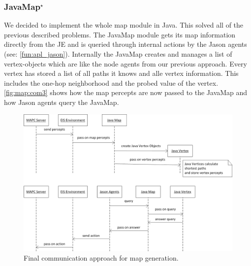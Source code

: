 \subsubsection[JavaMap]{JavaMap$^\star$}\label{alg:map_javamap}
We decided to implement the whole map module in Java. This solved all of the previous described problems. The JavaMap module gets its map information directly from the JE and is queried through internal actions by the Jason agents (see: \autoref{fun:apl_jason}). Internally the JavaMap creates and manages a list of vertex-objects which are like the node agents from our previous approach. Every vertex has stored a list of all paths it knows and alle vertex information. This includes the one-hop neighborhood and the probed value of the vertex. \autoref{fig:map:com3} shows how the map percepts are now passed to the JavaMap and how Jason agents query the JavaMap. 
\begin{figure}
  \centering
  \includegraphics[width=\linewidth]{images/map_com_3.png}
  \caption{Final communication approach for map generation.}
  \label{fig:map:com3}
\end{figure}

